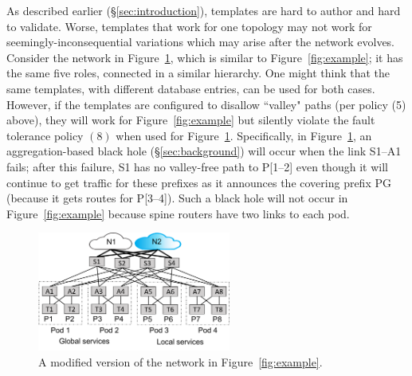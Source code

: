 \documentclass[numbers, 10pt]{sigplanconf}
\begin{document}

As described earlier (\S\ref{sec:introduction}), templates are hard to author and hard to validate. Worse, templates that work for one topology may not work for seemingly-inconsequential variations which may arise after the network evolves.
Consider the network in Figure~\ref{fig:example2}, which is similar to Figure~\ref{fig:example}; it has the same five roles, connected in a similar hierarchy. One might think that the same templates, with different database entries, can be used for both cases. However, if the templates are configured to disallow ``valley" paths (per policy (5) above), they will work for Figure~\ref{fig:example} but silently violate the fault tolerance policy $(8)$ when used for Figure~\ref{fig:example2}.  Specifically, in Figure~\ref{fig:example2}, an aggregation-based black hole (\S\ref{sec:background}) will occur when the link S1--A1 fails; after this failure, S1 has no valley-free path to P[1--2] even though it will continue to get traffic for these prefixes as it announces the covering prefix PG (because it gets routes for P[3--4]). Such a black hole will not occur in Figure~\ref{fig:example} because spine routers have two links to each pod.


\begin{figure}[t!]
  \centering
  \includegraphics[width=2.5in]{figures/example2}
  \vspace{-.8em}
  \caption{A modified version of the network in Figure~\ref{fig:example}.}
  \label{fig:example2}
  \vspace{-.8em}
\end{figure}
\end{document}

